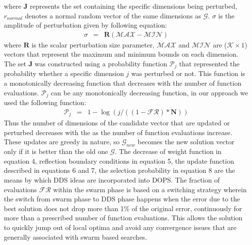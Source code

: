 \documentclass[12pt]{article}
\begin{document}
where $\mathbf{J}$ represents the set containing the specific dimensions being perturbed, ${r}_{normal}$ denotes a normal random vector of the same dimensions as $\mathcal{G}$. $\sigma$ is the amplitude of perturbation given by following equation:
\begin{eqnarray}
	\sigma& = &\mathbf{R}(\mathcal{MAX} -\mathcal{MIN})
\end{eqnarray}
where $\mathbf{R}$ is the scalar perturbation size parameter, $\mathcal{MAX}$ and $\mathcal{MIN}$ are ($\mathcal{K}\times{1}$) vectors that represent the maximum and minimum bounds on each dimension. The set $\mathbf{J}$ was constructed using a probability function $\mathcal{P}_{j}$ that represented the probability whether a specific dimension $j$ was perturbed or not.  This function is a monotonically decreasing function that decreases with the number of function evaluations. $\mathcal{P}_{j}$ can be any monotonically decreasing function, in our approach we used the following function:
\begin{eqnarray}
	\mathcal{P}_{j}&=&{1}-\log(j/ (({1}-\mathcal{FR})*\mathbf{N}))
\end{eqnarray}
Thus the number of dimensions of the candidate vector that are updated or perturbed decreases with the as the number of function evaluations increase. These updates are greedy in nature, so $\mathcal{G}_{new}$ becomes the new solution vector only if it is better than the old one $\mathcal{G}$. The decrease of weight function in equation 4, reflection boundary conditions in equation 5, the update function described in equations 6 and 7, the selection probability in equation 8 are the means by which DDS ideas are incorporated into DOPS.
The fraction of evaluations $\mathcal{FR}$  within the swarm phase is based on a switching strategy wherein the switch from swarm phase to DDS phase happens when the error due to the best solution does not drop more than 1\% of the original error, continuously for more than a prescribed number of function evaluations. This allows the solution to quickly jump out of local optima and avoid any convergence issues that are generally associated with swarm based searches.
\end{document}
